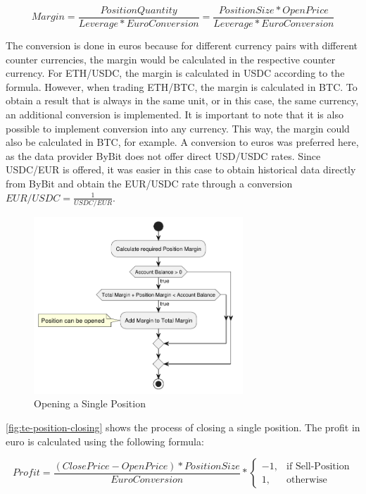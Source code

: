\[
    Margin = \frac{PositionQuantity}{Leverage * EuroConversion} = \frac{PositionSize * OpenPrice}{Leverage * EuroConversion}
\]

\noindent
The conversion is done in euros because for different currency pairs with different counter currencies, the margin would be calculated in the respective counter currency.
For ETH/USDC, the margin is calculated in USDC according to the formula.
However, when trading ETH/BTC, the margin is calculated in BTC.
To obtain a result that is always in the same unit, or in this case, the same currency, an additional conversion is implemented.
It is important to note that it is also possible to implement conversion into any currency.
This way, the margin could also be calculated in BTC, for example.
A conversion to euros was preferred here, as the data provider ByBit does not offer direct USD/USDC rates.
Since USDC/EUR is offered, it was easier in this case to obtain historical data directly from ByBit and obtain the EUR/USDC rate through a conversion $EUR/USDC = \frac{1}{USDC/EUR}$.

\begin{figure}[H]
    \centering
    \includegraphics[width=0.7\textwidth]{images/trading-engine/position-opening}
    \caption{Opening a Single Position}
    \label{fig:te-position-opening}
\end{figure}

\noindent
\autoref{fig:te-position-closing} shows the process of closing a single position.
The profit in euro is calculated using the following formula:

\[
    Profit = \frac{(ClosePrice - OpenPrice) * PositionSize}{EuroConversion} *
    \begin{cases}
        -1,& \text{if Sell-Position}\\
        1,              & \text{otherwise}
    \end{cases}
\]

